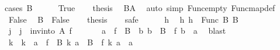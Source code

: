 \begin{isabellebody}
%
\isadelimproof
%
\endisadelimproof
%
\isatagproof
{}\isamarkupfalse%
{\isacharparenleft}{\kern0pt}cases\ {\isachardoublequoteopen}B{}\ {\isacharequal}{\kern0pt}\ {\isacharbraceleft}{\kern0pt}{\isacharbraceright}{\kern0pt}{\isachardoublequoteclose}{\isacharparenright}{\kern0pt}\isanewline
\ \ \isamarkupfalse%
\ True\isanewline
\ \ \isamarkupfalse%
\ {\isacharquery}{\kern0pt}thesis\ \isamarkupfalse%
\ B{}A{}\ \isamarkupfalse%
\ {\isacharparenleft}{\kern0pt}auto\ simp{\isacharcolon}{\kern0pt}\ Func{\isacharunderscore}{\kern0pt}empty\ Func{\isacharunderscore}{\kern0pt}map{\isacharunderscore}{\kern0pt}def{\isacharparenright}{\kern0pt}\isanewline
{}\isamarkupfalse%
\isanewline
\ \ \isamarkupfalse%
\ False\ \isamarkupfalse%
\ B{}\ {\isacharequal}{\kern0pt}\ False\isanewline
\ \ \isamarkupfalse%
\ {\isacharquery}{\kern0pt}thesis\isanewline
\ \ \isamarkupfalse%
\ safe\isanewline
\ \ \ \ \isamarkupfalse%
\ h\ \isamarkupfalse%
\ h{\isacharcolon}{\kern0pt}\ {\isachardoublequoteopen}h\ {\isasymin}\ Func\ B{}\ B{}{\isachardoublequoteclose}\isanewline
\ \ \ \ \isamarkupfalse%
\ j{}\ \ {\isachardoublequoteopen}j{}\ {\isacharequal}{\kern0pt}\ inv{\isacharunderscore}{\kern0pt}into\ A{}\ f{}{\isachardoublequoteclose}\isanewline
\ \ \ \ \isamarkupfalse%
\ {\isachardoublequoteopen}{\isasymforall}\ a{}\ {\isasymin}\ f{}\ {\isacharbackquote}{\kern0pt}\ B{}{\isachardot}{\kern0pt}\ {\isasymexists}\ b{}{\isachardot}{\kern0pt}\ b{}\ {\isasymin}\ B{}\ {\isasymand}\ f{}\ b{}\ {\isacharequal}{\kern0pt}\ a{}{\isachardoublequoteclose}\ \isamarkupfalse%
\ blast\isanewline
\ \ \ \ \isamarkupfalse%
\ \isamarkupfalse%
\ k\ \ k{\isacharcolon}{\kern0pt}\ {\isachardoublequoteopen}{\isasymforall}\ a{}\ {\isasymin}\ f{}\ {\isacharbackquote}{\kern0pt}\ B{}{\isachardot}{\kern0pt}\ k\ a{}\ {\isasymin}\ B{}\ {\isasymand}\ f{}\ {\isacharparenleft}{\kern0pt}k\ a{}{\isacharparenright}{\kern0pt}\ {\isacharequal}{\kern0pt}\ a{}{\isachardoublequoteclose}\isanewline

\end{isabellebody}
